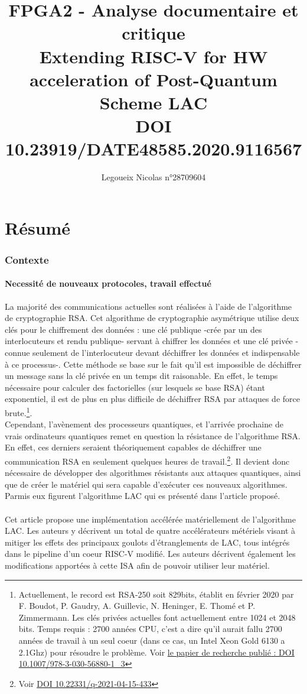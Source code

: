 \documentclass[10pt,a4paper]{article}
\author{Legoueix Nicolas n°28709604}
\title{FPGA2 - Analyse documentaire et critique \\ Extending RISC-V for HW acceleration of Post-Quantum Scheme LAC \\ DOI 10.23919/DATE48585.2020.9116567}
\begin{document}
\maketitle
\newpage
\part{Résumé}

\section{Contexte}
\subsection{Necessité de nouveaux protocoles, travail effectué}
La majorité des communications actuelles sont réalisées à l'aide de l'algorithme de cryptographie RSA. Cet algorithme de cryptographie asymétrique utilise deux clés pour le 
chiffrement des données : une clé publique -crée par un des interlocuteurs et rendu publique- servant à chiffrer les données et une clé privée -connue seulement de l'interlocuteur devant déchiffrer 
les données et indispensable à ce processus-. Cette méthode se base sur le fait qu'il est impossible de déchiffrer un message sans la clé privée en un temps dit raisonable. En effet, le temps nécessaire 
pour calculer des factorielles (sur lesquels se base RSA) étant exponentiel, il est de plus en plus difficile de déchiffrer RSA par attaques de force brute.\footnote{Actuellement, le record est RSA-250 soit 829bits, 
établit en février 2020 par F. Boudot, P. Gaudry, A. Guillevic, N. Heninger, E. Thomé et P. Zimmermann. Les clés privées actuelles font actuellement entre 1024 et 2048 bits. Temps requis : 
2700 années CPU, c'est a dire qu'il aurait fallu 2700 années de travail à un seul coeur (dans ce cas, un Intel Xeon Gold 6130 a 2.1Ghz) pour résoudre le problème. Voir \href{https://eprint.iacr.org/2020/697.pdf}{le papier de recherche publié : DOI 10.1007/978-3-030-56880-1\_3} }.\\
Cependant, l'avènement des processeurs quantiques, et l'arrivée prochaine de vrais ordinateurs quantiques remet en question la résistance de l'algorithme RSA. En effet, ces derniers seraient théoriquement
capables de déchiffrer une communication RSA en seulement quelques heures de travail.\footnote{Voir \href{https://quantum-journal.org/papers/q-2021-04-15-433/pdf/}{DOI 10.22331/q-2021-04-15-433}}. Il devient donc nécessaire
de développer des algorithmes résistants aux attaques quantiques, ainsi que de créer le matériel qui sera capable d'exécuter ces nouveaux algorithmes. Parmis eux figurent l'algorithme LAC qui es présenté dans l'article proposé.\\~\\
Cet article propose une implémentation accélérée matériellement de l'algorithme LAC. Les auteurs y décrivent un total de quatre accélérateurs métériels visant à mitiger les effets des principaux goulots d'étranglements 
de LAC, tous intégrés dans le pipeline d'un coeur RISC-V modifié. Les auteurs décrivent également les modifications apportées à cette ISA afin de pouvoir utiliser leur matériel.
\end{document}
